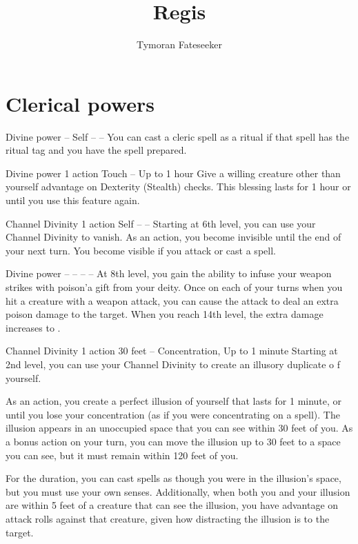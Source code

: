 \documentclass[10pt,twoside,twocolumn,openany]{book}
\begin{document}
\title{Regis}
\author{Tymoran Fateseeker}
\maketitle

\dndtoc

\chapter{Clerical powers}
{Divine power}
{--}
{Self}
{--}
{--}
%
You can cast a cleric spell as a ritual if that spell has the ritual tag and you have the spell prepared.

{Divine power}
{\color{action} 1 action}
{Touch}
{--}
{Up to 1 hour}
%
Give a willing creature other than yourself advantage on Dexterity (Stealth) checks. This blessing lasts for 1 hour or until you use this feature again.

{Channel Divinity}
{\color{action} 1 action}
{Self}
{--}
{--}
%
Starting at 6th level, you can use your Channel Divinity to vanish.
As an action, you become invisible until the end of your next turn. You become visible if you attack or cast a spell.

{Divine power}
{--}
{--}
{--}
{--}
%
At 8th level, you gain the ability to infuse your weapon strikes with poison'a gift from your deity. Once on each of your turns when you hit a creature with a weapon attack, you can cause the attack to deal an extra  poison damage to the target. When you reach 14th level, the extra damage increases to .

{Channel Divinity}
{\color{action} 1 action}
{30 feet}
{--}
{{\color{concentration}Concentration}, Up to 1 minute}
%
Starting at 2nd level, you can use your Channel Divinity to create an illusory duplicate o f yourself.

As an action, you create a perfect illusion of yourself that lasts for 1 minute, or until you lose your concentration (as if you were concentrating on a spell). The illusion appears in an unoccupied space that you can see within 30 feet of you. As a bonus action on your turn, you can move the illusion up to 30 feet to a space you can see, but it must remain within 120 feet of you.

For the duration, you can cast spells as though you were in the illusion's space, but you must use your own senses. Additionally, when both you and your illusion are within 5 feet of a creature that can see the illusion, you have advantage on attack rolls against that creature, given how distracting the illusion is to the target.
\end{document}
